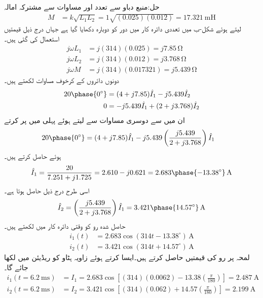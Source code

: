 حل:منبع دباو سے تعدد  اور مساوات  سے مشترکہ امالہ
\begin{align*}
M&=k\sqrt{L_1 L_2}=1\sqrt{(0.025)(0.012)}=\SI{17.321}{\milli\henry}
\end{align*}
لیتے ہوئے شکل-ب میں تعددی دائرہ کار میں دور کو دوبارہ دکھایا گیا ہے جہاں درج ذیل قیمتیں استعمال کی گئی ہیں۔
\begin{align*}
j\omega L_1&=j (314)(0.025)=j7.85\,\si{\ohm}\\
j\omega L_2&=j(314)(0.012)=j3.768\,\si{\ohm}\\
j\omega M&=j (314)(0.017321)=j5.439\,\si{\ohm}
\end{align*}
دونوں دائروں کے کرخوف مساوات لکھتے ہیں۔
\begin{align*}
20\phase{0^{\circ}}&=(4+j7.85)\hat{I}_1-j5.439\hat{I}_2\\
0&=-j5.439\hat{I}_1+(2+j3.768)\hat{I}_2
\end{align*}
ان میں سے دوسری مساوات سے  لیتے ہوئے پہلی میں پر کرتے
\begin{align*}
20\phase{0^{\circ}}&=(4+j7.85)\hat{I}_1-j5.439\left(\frac{j5.439 }{2+j3.768}\right)\hat{I}_1
\end{align*}
ہوئے  حاصل کرتے ہیں۔
\begin{align*}
\hat{I}_1=\frac{20}{7.251+j1.725}=2.610-j0.621=2.683\phase{-13.38^{\circ}}\,\si{\ampere}
\end{align*}
اسی طرح  درج ذیل حاصل ہوتا ہے۔
\begin{align*}
\hat{I}_2=\left(\frac{j5.439}{2+j3.768}\right) \hat{I}_1=3.421\phase{14.57^{\circ}}\,\si{\ampere}
\end{align*}
حاصل شدہ رو کو وقتی دائرہ کار میں لکھتے ہیں۔
\begin{align*}
i_1(t)&=2.683\cos(314t-13.38^{\circ}) \, \si{\ampere}\\
i_2(t)&=3.421\cos(314t+14.57^{\circ})\,\si{\ampere}
\end{align*}
لمحہ  پر رو کی قیمتیں حاصل کرتے ہیں۔ایسا کرتے ہوئے زاویہ ہٹاو کو ریڈیئن میں لکھا جائے گا۔
\begin{align*}
i_1(t=\SI{6.2}{\milli\second})&=I_1=2.683\cos\left[(314)(0.0062)-13.38\left(\frac{\pi}{180}\right)\right]=\SI{2.487}{\ampere}\\
i_2(t=\SI{6.2}{\milli\second})&=I_2=3.421\cos\left[(314)(0.062)+14.57\left(\frac{\pi}{180}\right)\right]=\SI{2.199}{\ampere}
\end{align*}
